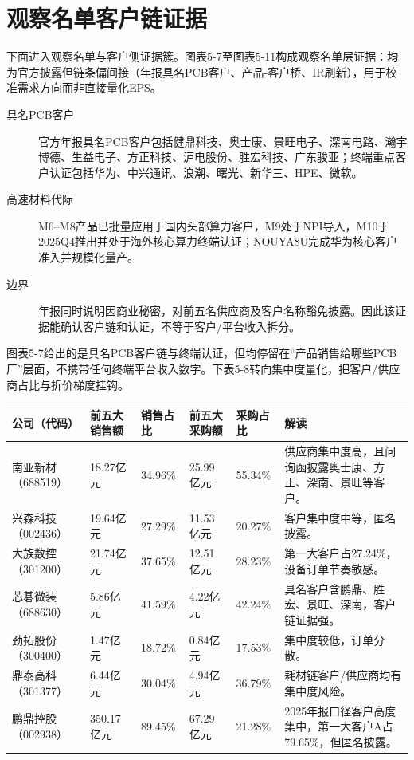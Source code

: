 \section{观察名单客户链证据}

下面进入观察名单与客户侧证据簇。图表5-7至图表5-11构成观察名单层证据：均为官方披露但链条偏间接（年报具名PCB客户、产品-客户桥、IR刷新），用于校准需求方向而非直接量化EPS。

\begin{exhibitbox}[图表5-7：南亚新材官方具名客户链证据]
\footnotesize
\begin{description}
  \item[具名PCB客户] 官方年报具名PCB客户包括健鼎科技、奥士康、景旺电子、深南电路、瀚宇博德、生益电子、方正科技、沪电股份、胜宏科技、广东骏亚；终端重点客户认证包括华为、中兴通讯、浪潮、曙光、新华三、HPE、微软。
  \item[高速材料代际] M6--M8产品已批量应用于国内头部算力客户，M9处于NPI导入，M10于2025Q4推出并处于海外核心算力终端认证；NOUYA8U完成华为核心客户准入并规模化量产。
  \item[边界] 年报同时说明因商业秘密，对前五名供应商及客户名称豁免披露。因此该证据能确认客户链和认证，不等于客户/平台收入拆分。
\end{description}
\end{exhibitbox}

图表5-7给出的是具名PCB客户链与终端认证，但均停留在``产品销售给哪些PCB厂''层面，不携带任何终端平台收入数字。下表5-8转向集中度量化，把客户/供应商占比与折价梯度挂钩。

\begin{exhibitbox}[图表5-8：观察名单客户与供应商集中度]
\footnotesize
\begin{tabularx}{\textwidth}{L{1.8cm}R{2.0cm}R{1.6cm}R{2.0cm}R{1.6cm}X}
\toprule
\textbf{公司（代码）} & \textbf{前五大销售额} & \textbf{销售占比} & \textbf{前五大采购额} & \textbf{采购占比} & \textbf{解读} \\
\midrule
南亚新材（688519） & 18.27亿元 & 34.96\% & 25.99亿元 & 55.34\% & 供应商集中度高，且问询函披露奥士康、方正、深南、景旺等客户。 \\
兴森科技（002436） & 19.64亿元 & 27.29\% & 11.53亿元 & 20.27\% & 客户集中度中等，匿名披露。 \\
大族数控（301200） & 21.74亿元 & 37.65\% & 12.51亿元 & 28.23\% & 第一大客户占27.24\%，设备订单节奏敏感。 \\
芯碁微装（688630） & 5.86亿元 & 41.59\% & 4.22亿元 & 42.24\% & 具名客户含鹏鼎、胜宏、景旺、深南，客户链证据强。 \\
劲拓股份（300400） & 1.47亿元 & 18.72\% & 0.84亿元 & 17.53\% & 集中度较低，订单分散。 \\
鼎泰高科（301377） & 6.44亿元 & 30.04\% & 4.94亿元 & 36.79\% & 耗材链客户/供应商均有集中度风险。 \\
鹏鼎控股（002938） & 350.17亿元 & 89.45\% & 67.29亿元 & 21.28\% & 2025年报口径客户高度集中，第一大客户A占79.65\%，但匿名披露。 \\
\bottomrule
\end{tabularx}
\end{exhibitbox}

